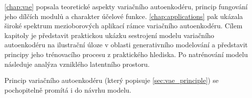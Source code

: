 \autoref{chap:vae} popsala teoretické aspekty variačního autoenkodéru, princip fungování jeho dílčích modulů a charakter účelové funkce.
\autoref{chap:applications} pak ukázala široké spektrum mezioborových aplikací rámce variačního autoenkodéru.
Cílem  kapitoly je představit praktickou ukázku sestrojení modelu variačního autoenkodéru na ilustrační úloze v oblasti generativního modelování a představit principy jeho trénovacího procesu z praktického hlediska.
Po natrénování modelu následuje analýza vzniklého latentního prostoru.

Princip variačního autoenkodéru (který popisuje \autoref{sec:vae_principle}) se pochopitelně promítá i do návrhu modelu.